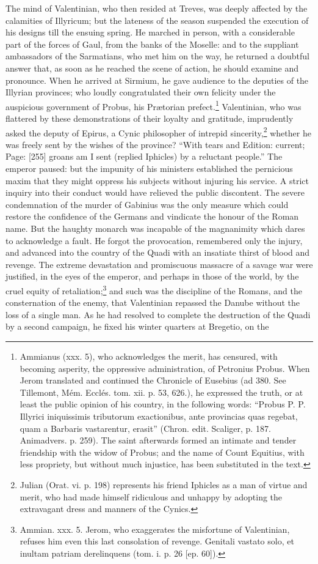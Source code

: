 The mind of Valentinian, who then resided at Treves, was deeply affected by the calamities of Illyricum; but the lateness of the season suspended the execution of his designs till the ensuing spring. He marched in person, with a considerable part of the forces of Gaul, from the banks of the Moselle: and to the suppliant ambassadors of the Sarmatians, who met him on the way, he returned a doubtful answer that, as soon as he reached the scene of action, he should examine and pronounce. When he arrived at Sirmium, he gave audience to the deputies of the Illyrian provinces; who loudly congratulated their own felicity under the auspicious government of Probus, his Prætorian prefect.\footnote{Ammianus (xxx. 5), who acknowledges the merit, has censured, with becoming asperity, the oppressive administration, of Petronius Probus. When Jerom translated and continued the Chronicle of Eusebius (ad 380. See Tillemont, Mém. Ecclés. tom. xii. p. 53, 626.), he expressed the truth, or at least the public opinion of his country, in the following words: \texthebrew{“}Probus P. P. Illyrici iniquissimis tributorum exactionibus, ante provincias quas regebat, quam a Barbaris vastarentur, erasit\texthebrew{}” (Chron. edit. Scaliger, p. 187. Animadvers. p. 259). The saint afterwards formed an intimate and tender friendship with the widow of Probus; and the name of Count Equitius, with less propriety, but without much injustice, has been substituted in the text.} Valentinian, who was flattered by these demonstrations of their loyalty and gratitude, imprudently asked the deputy of Epirus, a Cynic philosopher of intrepid sincerity,\footnote{Julian (Orat. vi. p. 198) represents his friend Iphicles as a man of virtue and merit, who had made himself ridiculous and unhappy by adopting the extravagant dress and manners of the Cynics.} whether he was freely sent by the wishes of the province? \texthebrew{“}With tears and Edition: current; Page: [255] groans am I sent (replied Iphicles) by a reluctant people.\texthebrew{}” The emperor paused: but the impunity of his ministers established the pernicious maxim that they might oppress his subjects without injuring his service. A strict inquiry into their conduct would have relieved the public discontent. The severe condemnation of the murder of Gabinius was the only measure which could restore the confidence of the Germans and vindicate the honour of the Roman name. But the haughty monarch was incapable of the magnanimity which dares to acknowledge a fault. He forgot the provocation, remembered only the injury, and advanced into the country of the Quadi with an insatiate thirst of blood and revenge. The extreme devastation and promiscuous massacre of a savage war were justified, in the eyes of the emperor, and perhaps in those of the world, by the cruel equity of retaliation;\footnote{Ammian. xxx. 5. Jerom, who exaggerates the misfortune of Valentinian, refuses him even this last consolation of revenge. Genitali vastato solo, et inultam patriam derelinquens (tom. i. p. 26 [ep. 60]).} and such was the discipline of the Romans, and the consternation of the enemy, that Valentinian repassed the Danube without the loss of a single man. As he had resolved to complete the destruction of the Quadi by a second campaign, he fixed his winter quarters at Bregetio, on the 